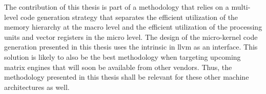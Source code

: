 \documentclass[\main/thesis.tex]{subfiles}
\begin{document}
The contribution of this thesis is part of a methodology that relies on a multi-level code generation strategy that separates the efficient utilization of the memory hierarchy at the macro level and the efficient utilization of the processing units and vector registers in the micro level.
The design of the micro-kernel code generation presented in this thesis uses the  \gls{intrinsic} in \gls{llvm} as an interface.
This solution is likely to also be the best methodology when targeting upcoming \glspl{matrix engine} that will soon be available from other vendors.
Thus, the methodology presented in this thesis shall be relevant for these other machine architectures as well.
\end{document}
